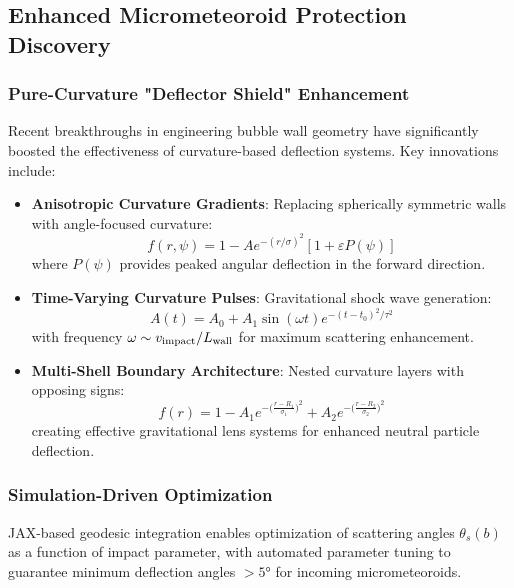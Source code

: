 \documentclass[11pt]{article}
\begin{document}
\subsection{Enhanced Micrometeoroid Protection Discovery}

\subsubsection{Pure-Curvature "Deflector Shield" Enhancement}
Recent breakthroughs in engineering bubble wall geometry have significantly boosted the effectiveness of curvature-based deflection systems. Key innovations include:

\begin{itemize}
\item \textbf{Anisotropic Curvature Gradients}: Replacing spherically symmetric walls with angle-focused curvature:
\begin{equation}
f(r,\psi) = 1 - A e^{-(r/\sigma)^2} [1 + \varepsilon P(\psi)]
\end{equation}
where $P(\psi)$ provides peaked angular deflection in the forward direction.

\item \textbf{Time-Varying Curvature Pulses}: Gravitational shock wave generation:
\begin{equation}
A(t) = A_0 + A_1 \sin(\omega t) e^{-(t-t_0)^2/\tau^2}
\end{equation}
with frequency $\omega \sim v_{\rm impact}/L_{\rm wall}$ for maximum scattering enhancement.

\item \textbf{Multi-Shell Boundary Architecture}: Nested curvature layers with opposing signs:
\begin{equation}
f(r) = 1 - A_1 e^{-\bigl(\tfrac{r-R_1}{\sigma_1}\bigr)^2} + A_2 e^{-\bigl(\tfrac{r-R_2}{\sigma_2}\bigr)^2}
\end{equation}
creating effective gravitational lens systems for enhanced neutral particle deflection.
\end{itemize}

\subsubsection{Simulation-Driven Optimization}
JAX-based geodesic integration enables optimization of scattering angles $\theta_s(b)$ as a function of impact parameter, with automated parameter tuning to guarantee minimum deflection angles $>5°$ for incoming micrometeoroids.
\end{document}
